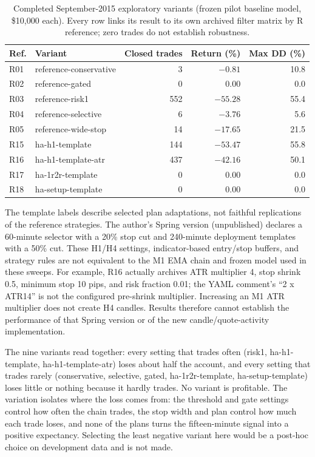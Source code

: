 \begin{table}[htbp]
\centering
\caption{Completed September-2015 exploratory variants (frozen pilot baseline model, \$10,000 each). Every row links its result to its own archived filter matrix by R reference; zero trades do not establish robustness.}
\label{tab:intermediate-sweeps}
\small
\begin{tabular}{llrrr}
\toprule
\textbf{Ref.} & \textbf{Variant} & \textbf{Closed trades} & \textbf{Return (\%)} & \textbf{Max DD (\%)} \\
\midrule
R01 & reference-conservative & 3 & $-0.81$ & 10.8 \\
R02 & reference-gated & 0 & 0.00 & 0.0 \\
R03 & reference-risk1 & 552 & $-55.28$ & 55.4 \\
R04 & reference-selective & 6 & $-3.76$ & 5.6 \\
R05 & reference-wide-stop & 14 & $-17.65$ & 21.5 \\
R15 & ha-h1-template & 144 & $-53.47$ & 55.8 \\
R16 & ha-h1-template-atr & 437 & $-42.16$ & 50.1 \\
R17 & ha-1r2r-template & 0 & 0.00 & 0.0 \\
R18 & ha-setup-template & 0 & 0.00 & 0.0 \\
\bottomrule
\end{tabular}
\end{table}

The template labels describe selected plan adaptations, not faithful replications of the reference strategies. The author's Spring version (unpublished) declares a 60-minute selector with a 20\% stop cut and 240-minute deployment templates with a 50\% cut. These H1/H4 settings, indicator-based entry/stop buffers, and strategy rules are not equivalent to the M1 EMA chain and frozen model used in these sweeps. For example, R16 actually archives ATR multiplier 4, stop shrink 0.5, minimum stop 10 pips, and risk fraction 0.01; the YAML comment's ``2 x ATR14'' is not the configured pre-shrink multiplier. Increasing an M1 ATR multiplier does not create H4 candles. Results therefore cannot establish the performance of that Spring version or of the new candle/quote-activity implementation.

The nine variants read together: every setting that trades often (risk1, ha-h1-template, ha-h1-template-atr) loses about half the account, and every setting that trades rarely (conservative, selective, gated, ha-1r2r-template, ha-setup-template) loses little or nothing because it hardly trades. No variant is profitable. The variation isolates where the loss comes from: the threshold and gate settings control how often the chain trades, the stop width and plan control how much each trade loses, and none of the plans turns the fifteen-minute signal into a positive expectancy. Selecting the least negative variant here would be a post-hoc choice on development data and is not made.

